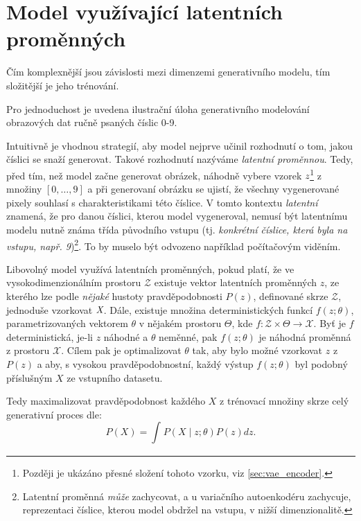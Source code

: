\section{Model využívající latentních proměnných}
\label{sec:latent_variable_model}
Čím komplexnější jsou závislosti mezi dimenzemi generativního modelu, tím složitější je jeho trénování.

Pro jednoduchost je uvedena ilustrační úloha generativního modelování obrazových dat ručně psaných číslic 0-9.

Intuitivně je  vhodnou strategií, aby model nejprve učinil rozhodnutí o tom, jakou číslici se snaží generovat.
Takové rozhodnutí nazýváme \emph{latentní proměnnou}. Tedy, před tím, než model začne generovat obrázek, náhodně vybere vzorek $\emph{z}$\footnote{Později je ukázáno přesné složení tohoto vzorku, viz \autoref{sec:vae_encoder}.} z množiny $[0, \dots, 9]$ a při generovaní obrázku se ujistí, že všechny vygenerované pixely souhlasí s charakteristikami této číslice.
V tomto kontextu \emph{latentní} znamená, že pro danou číslici, kterou model vygeneroval, nemusí být latentnímu modelu nutně známa třída původního vstupu (tj. \emph{konkrétní číslice, která byla na vstupu, např. 9})\footnote{Latentní proměnná \emph{může} zachycovat, a u variačního autoenkodéru zachycuje, reprezentaci číslice, kterou model obdržel na vstupu, v nižší dimenzionalitě.}. To by muselo být odvozeno například počítačovým viděním. \cite{Doersch2021}

Libovolný model využívá latentních proměnných, pokud platí, že ve vysokodimenzionálním prostoru $\mathcal{Z}$ existuje vektor latentních proměnných $z$, ze kterého lze podle \emph{nějaké} hustoty pravděpodobnosti $P(z)$, definované skrze $\mathcal{Z}$, jednoduše vzorkovat $\emph{X}$.
Dále, existuje množina deterministických funkcí $f(z;\theta)$, parametrizovaných vektorem $\theta$ v nějakém prostoru $\Theta$, kde $f: \mathcal{Z} \times \Theta \rightarrow \mathcal{X}$. Byť je $f$ deterministická, je-li $z$ náhodné a $\theta$ neměnné, pak $f(z;\theta)$ je náhodná proměnná z prostoru $\mathcal{X}$.
Cílem pak je optimalizovat $\theta$ tak, aby bylo možné vzorkovat $z$ z $P(z)$ a aby, s vysokou pravděpodobnostní, každý výstup $f(z; \theta)$ byl podobný příslušným $X$ ze vstupního datasetu. \cite{Doersch2021}

Tedy maximalizovat pravděpodobnost každého $X$ z trénovací množiny skrze celý generativní proces dle:
\begin{equation}\label{eq:maximum_likelihood}
    P(X) = \int_{}^{} P(X\mid z;\theta)P(z)dz.
\end{equation}

